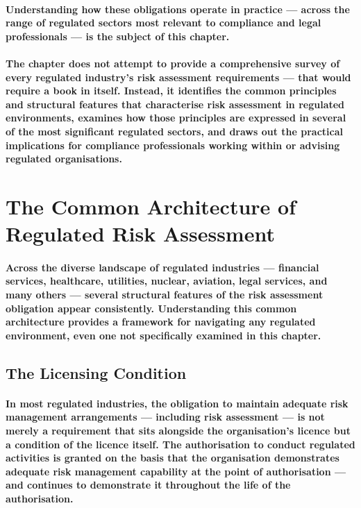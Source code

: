 \paragraph{Understanding how these obligations operate in practice — across the range of regulated sectors most relevant to compliance and legal professionals — is the subject of this chapter.}
\paragraph{The chapter does not attempt to provide a comprehensive survey of every regulated industry's risk assessment requirements — that would require a book in itself. Instead, it identifies the common principles and structural features that characterise risk assessment in regulated environments, examines how those principles are expressed in several of the most significant regulated sectors, and draws out the practical implications for compliance professionals working within or advising regulated organisations.}

\section{The Common Architecture of Regulated Risk Assessment}
\paragraph{Across the diverse landscape of regulated industries — financial services, healthcare, utilities, nuclear, aviation, legal services, and many others — several structural features of the risk assessment obligation appear consistently. Understanding this common architecture provides a framework for navigating any regulated environment, even one not specifically examined in this chapter.}

\subsection{The Licensing Condition}
\paragraph{In most regulated industries, the obligation to maintain adequate risk management arrangements — including risk assessment — is not merely a requirement that sits alongside the organisation's licence but a \textbf{condition of the licence itself}. The authorisation to conduct regulated activities is granted on the basis that the organisation demonstrates adequate risk management capability at the point of authorisation — and continues to demonstrate it throughout the life of the authorisation.}
